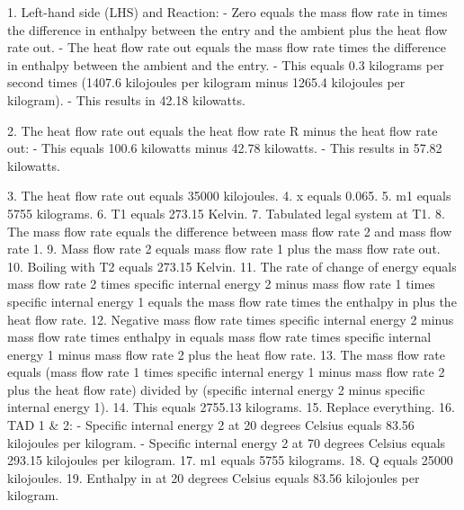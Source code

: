 1. Left-hand side (LHS) and Reaction:
   - Zero equals the mass flow rate in times the difference in enthalpy between the entry and the ambient plus the heat flow rate out.
   - The heat flow rate out equals the mass flow rate times the difference in enthalpy between the ambient and the entry.
   - This equals 0.3 kilograms per second times (1407.6 kilojoules per kilogram minus 1265.4 kilojoules per kilogram).
   - This results in 42.18 kilowatts.

2. The heat flow rate out equals the heat flow rate R minus the heat flow rate out:
   - This equals 100.6 kilowatts minus 42.78 kilowatts.
   - This results in 57.82 kilowatts.

3. The heat flow rate out equals 35000 kilojoules.
4. x equals 0.065.
5. m1 equals 5755 kilograms.
6. T1 equals 273.15 Kelvin.
7. Tabulated legal system at T1.
8. The mass flow rate equals the difference between mass flow rate 2 and mass flow rate 1.
9. Mass flow rate 2 equals mass flow rate 1 plus the mass flow rate out.
10. Boiling with T2 equals 273.15 Kelvin.
11. The rate of change of energy equals mass flow rate 2 times specific internal energy 2 minus mass flow rate 1 times specific internal energy 1 equals the mass flow rate times the enthalpy in plus the heat flow rate.
12. Negative mass flow rate times specific internal energy 2 minus mass flow rate times enthalpy in equals mass flow rate times specific internal energy 1 minus mass flow rate 2 plus the heat flow rate.
13. The mass flow rate equals (mass flow rate 1 times specific internal energy 1 minus mass flow rate 2 plus the heat flow rate) divided by (specific internal energy 2 minus specific internal energy 1).
14. This equals 2755.13 kilograms.
15. Replace everything.
16. TAD 1 & 2:
    - Specific internal energy 2 at 20 degrees Celsius equals 83.56 kilojoules per kilogram.
    - Specific internal energy 2 at 70 degrees Celsius equals 293.15 kilojoules per kilogram.
17. m1 equals 5755 kilograms.
18. Q equals 25000 kilojoules.
19. Enthalpy in at 20 degrees Celsius equals 83.56 kilojoules per kilogram.